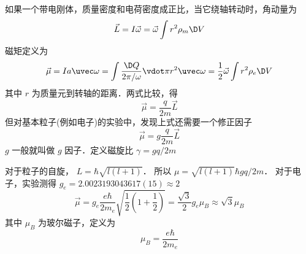 
如果一个带电刚体，质量密度和电荷密度成正比，当它绕轴转动时，角动量为
\begin{equation}
\vec L = I\vec \omega  = \vec \omega \int {{r^2}{\rho _m}\D V} 
\end{equation}
磁矩定义为
\begin{equation}
\vec \mu  = Ia {\uvec\omega}= \int \frac{\D Q}{2\pi/\omega} \vdot \pi {r^2}\uvec \omega
= \frac{1}{2}\vec \omega \int r^2\rho _e \D V 
\end{equation}
其中 $r$ 为质量元到转轴的距离．两式比较，得
\begin{equation}
\vec \mu  = \frac{q}{{2m}}\vec L
\end{equation}
但对基本粒子(例如电子)的实验中，发现上式还需要一个修正因子
\begin{equation}
\vec \mu  = g\frac{q}{{2m}}\vec L
\end{equation}
$g$ 一般就叫做 $g$ 因子．定义磁旋比 $\gamma  = gq/{2m}$


对于粒子的自旋， $L = \hbar \sqrt {l\left( {l + 1} \right)} $． 所以 $\mu  = \sqrt {l\left( {l + 1} \right)}\hbar g{{q}}/{{2m}} $． 
对于电子，实验测得 ${g_e} = 2.0023193043617(15) \approx 2$ 
\begin{equation}
\vec \mu  = {g_e}\frac{{e\hbar }}{{2{m_e}}}\sqrt {\frac{1}{2}\left( {1 + \frac{1}{2}} \right)}  = \frac{{\sqrt 3 }}{2}{g_e}{\mu _B} \approx \sqrt 3 {\mu _B}
\end{equation}
其中 ${\mu _B}$ 为玻尔磁子，定义为
\begin{equation}
{\mu _B} = \frac{{e\hbar }}{{2{m_e}}}
\end{equation}

